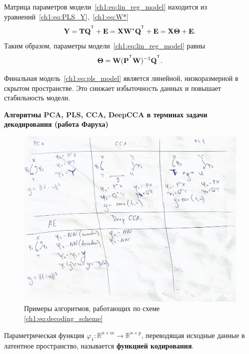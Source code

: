 Матрица параметров модели~\ref{ch1:eq:lin_reg_model} находится из уравнений~\eqref{ch1:eq:PLS_Y},~\eqref{ch1:eq:W*}
\begin{equation*}
	\bY = \bT \bQ^{\T} + \bE = \bX \bW^* \bQ^{\T} + \bE = \bX \bTheta + \bE.
	\label{ch1:eq:pls_model}
\end{equation*}
Таким образом, параметры модели~\eqref{ch1:eq:lin_reg_model} равны
\begin{equation}
	\bTheta = \bW (\bP^{\T} \bW)^{-1} \bQ^{\T}.
	\label{ch1:eq:linear_regression_model_parameters}
\end{equation}

Финальная модель~\eqref{ch1:eq:pls_model} является линейной, низкоразмерной в скрытом пространстве. 
Это снижает избыточность данных и повышает стабильность модели.

\hrulefill

\textbf{Алгоритмы PCA, PLS, CCA, DeepCCA в терминах задачи декодирования (работа Фаруха)}

\begin{figure}[!ht]
	\centering
	\includegraphics[width=\linewidth]{figs/ch1/Examples}
	\caption{Примеры алгоритмов, работающих по схеме \ref{ch1:eq:decoding_scheme}}
	\label{ch1:fig:PLSFigure}
\end{figure}

\begin{definition}
Параметрическая функция $\varphi_1: \mathbb{R}^{n \times m} \to \mathbb{R}^{n \times p}$, переводящая исходные данные в латентное пространство, называется \textbf{функцией кодирования}.
\end{definition}

